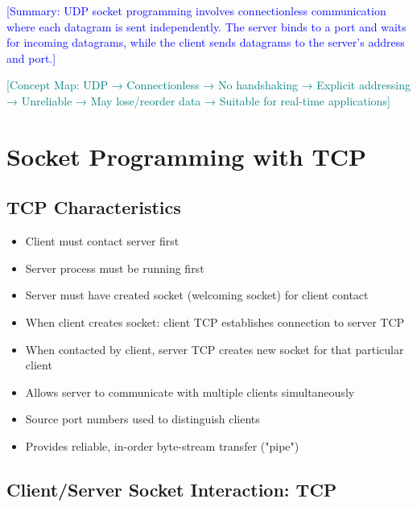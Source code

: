 \documentclass[12pt]{article}
\begin{document}
\textcolor{blue}{[Summary: UDP socket programming involves connectionless communication where each datagram is sent independently. The server binds to a port and waits for incoming datagrams, while the client sends datagrams to the server's address and port.]}

\textcolor{teal}{[Concept Map: UDP → Connectionless → No handshaking → Explicit addressing → Unreliable → May lose/reorder data → Suitable for real-time applications]}

\section{Socket Programming with TCP}

\subsection{TCP Characteristics}

\begin{itemize}
    \item Client must contact server first
    \item Server process must be running first
    \item Server must have created socket (welcoming socket) for client contact
    \item When client creates socket: client TCP establishes connection to server TCP
    \item When contacted by client, server TCP creates new socket for that particular client
    \item Allows server to communicate with multiple clients simultaneously
    \item Source port numbers used to distinguish clients
    \item Provides reliable, in-order byte-stream transfer ("pipe")
\end{itemize}

\subsection{Client/Server Socket Interaction: TCP}
\end{document}
